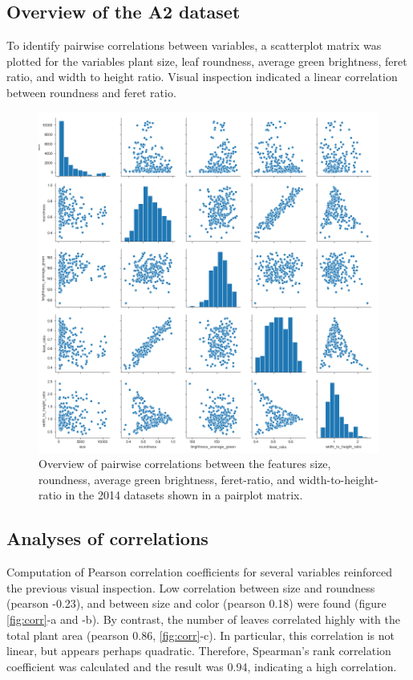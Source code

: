 \documentclass[paper=A4,bibliography=totocnumbered]{scrartcl}
\begin{document}
\subsection{Overview of the A2 dataset}
To identify pairwise correlations between variables, a scatterplot matrix was plotted for the variables plant size, leaf roundness, average green brightness, feret ratio, and width to height ratio. Visual inspection indicated a linear correlation between roundness and feret ratio. 
 
\begin{figure}
	\centering
	\includegraphics[width=13cm]{pic/overview}
	\caption{Overview of pairwise correlations between the features size, roundness, average green brightness, feret-ratio, and width-to-height-ratio in the 2014 datasets shown in a pairplot matrix.}
	\label{fig:overview}
\end{figure}

\subsection{Analyses of correlations}
Computation of Pearson correlation coefficients for several variables reinforced the previous visual inspection. Low correlation between size and roundness (pearson -0.23), and between size and color (pearson 0.18) were found (figure \ref{fig:corr}-a and -b). By contrast, the number of leaves correlated highly with the total plant area (pearson 0.86, \ref{fig:corr}-c). In particular, this correlation is not linear, but appears perhaps quadratic. Therefore, Spearman's rank correlation coefficient was calculated and the result was 0.94, indicating a high correlation. 
\end{document}

